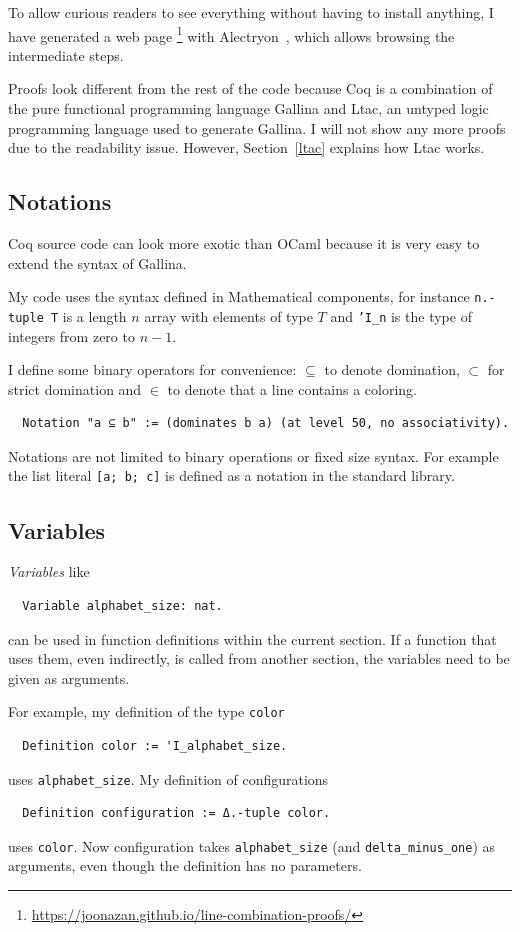 \documentclass[english, 12pt, a4paper, sci, a-1b, online]{aaltothesis}
\newcommand\icoq[1]{\texttt{#1}}
\begin{document}
To allow curious readers to see everything without having to install anything, I have generated a web page \footnote{\url{https://joonazan.github.io/line-combination-proofs/}} with Alectryon~\cite{alectryon}, which allows browsing the intermediate steps.

Proofs look different from the rest of the code because Coq is a combination of the pure functional programming language Gallina and Ltac, an untyped logic programming language used to generate Gallina. I will not show any more proofs due to the readability issue. However, Section~\ref{ltac} explains how Ltac works.

\subsection{Notations}

Coq source code can look more exotic than OCaml because it is very easy to extend the syntax of Gallina.

My code uses the syntax defined in Mathematical components, for instance \icoq{n.-tuple T} is a length $n$ array with elements of type $T$ and \icoq{'I_n} is the type of integers from zero to $n-1$.

I define some binary operators for convenience: $\subseteq$ to denote domination, $\subset$ for strict domination and $\in$ to denote that a line contains a coloring.
\begin{verbatim}
  Notation "a ⊆ b" := (dominates b a) (at level 50, no associativity).
\end{verbatim}

Notations are not limited to binary operations or fixed size syntax. For example the list literal \icoq{[a; b; c]} is defined as a notation in the standard library.

\subsection{Variables}

\emph{Variables} like
\begin{verbatim}
  Variable alphabet_size: nat.
\end{verbatim}
can be used in function definitions within the current section. If a function that uses them, even indirectly, is called from another section, the variables need to be given as arguments.

For example, my definition of the type \icoq{color}
\begin{verbatim}
  Definition color := 'I_alphabet_size.
\end{verbatim}
uses \icoq{alphabet_size}. My definition of configurations
\begin{verbatim}
  Definition configuration := Δ.-tuple color.
\end{verbatim}
uses \icoq{color}. Now configuration takes \icoq{alphabet_size} (and \icoq{delta_minus_one}) as arguments, even though the definition has no parameters.
\end{document}
